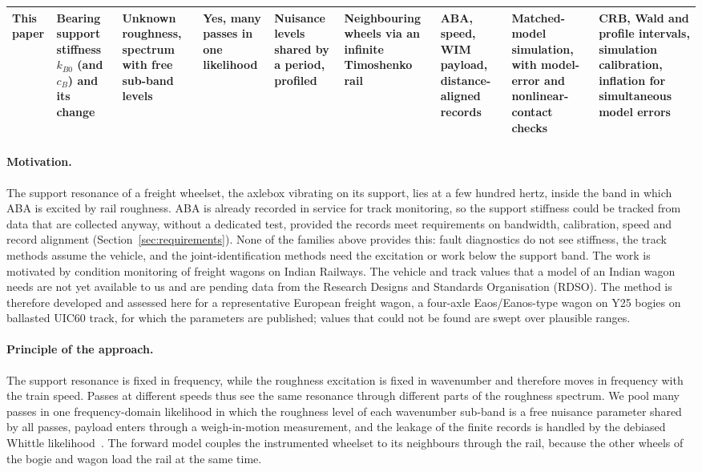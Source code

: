 \begin{table}[tbp]
{\begin{tabular}{p{2.2cm}p{2.0cm}p{2.1cm}p{1.8cm}p{2.1cm}p{1.6cm}p{2.0cm}p{1.9cm}p{1.9cm}}
This paper & Bearing support stiffness $k_{B0}$ (and $c_B$) and its change & Unknown roughness, spectrum with free sub-band levels & Yes, many passes in one likelihood & Nuisance levels shared by a period, profiled & Neighbouring wheels via an infinite Timoshenko rail & ABA, speed, WIM payload, distance-aligned records & Matched-model simulation, with model-error and nonlinear-contact checks & CRB, Wald and profile intervals, simulation calibration, inflation for simultaneous model errors \\
\bottomrule
\end{tabular}}
\end{table}

\paragraph{Motivation.} The support resonance of a freight wheelset, the axlebox vibrating on its
support, lies at a few hundred hertz, inside the band in which ABA is excited by rail roughness. ABA is
already recorded in service for track monitoring, so the support stiffness could be tracked from data
that are collected anyway, without a dedicated test, provided the records meet requirements on bandwidth,
calibration, speed and record alignment (Section~\ref{sec:requirements}). None of the families above provides
this: fault diagnostics do not see stiffness, the track methods assume the vehicle, and the
joint-identification methods need the excitation or work below the support band. The work is
motivated by condition monitoring of freight wagons on Indian Railways. The vehicle and track values
that a model of an Indian wagon needs are not yet available to us and are pending data from the
Research Designs and Standards Organisation (RDSO). The method is therefore developed and assessed
here for a representative European freight wagon, a four-axle Eaos/Eanos-type wagon on Y25 bogies on
ballasted UIC60 track, for which the parameters are published; values that could not be found are swept
over plausible ranges.

\paragraph{Principle of the approach.} The support resonance is fixed in frequency, while the roughness
excitation is fixed in wavenumber and therefore moves in frequency with the train speed. Passes at
different speeds thus see the same resonance through different parts of the roughness spectrum. We pool
many passes in one frequency-domain likelihood in which the roughness level of each wavenumber sub-band
is a free nuisance parameter shared by all passes, payload enters through a weigh-in-motion measurement,
and the leakage of the finite records is handled by the debiased Whittle likelihood~\citep{sykulski2019}.
The forward model couples the instrumented wheelset to its neighbours through the rail, because the
other wheels of the bogie and wagon load the rail at the same time.

